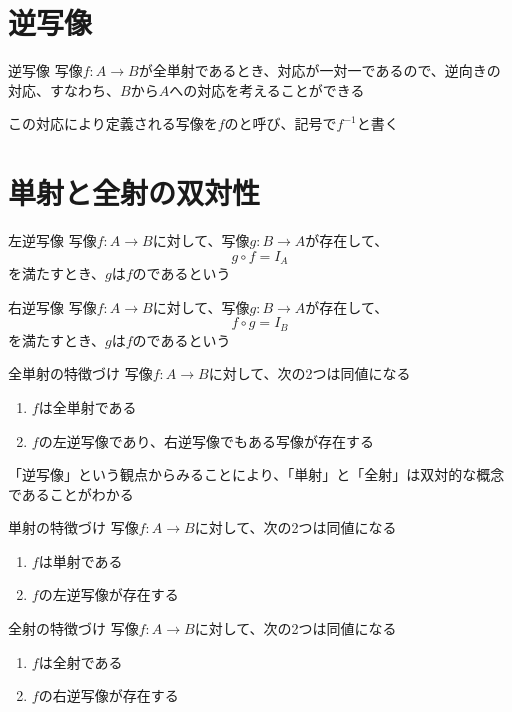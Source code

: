 \documentclass[../../../topic_mapping]{subfiles}
\begin{document}
\sectionline
\section{逆写像}

\begin{definition}{逆写像}
  写像$f\colon A \to B$が全単射であるとき、対応が一対一であるので、逆向きの対応、すなわち、$B$から$A$への対応を考えることができる

  この対応により定義される写像を$f$のと呼び、記号で$f^{-1}$と書く
\end{definition}

\sectionline
\section{単射と全射の双対性}

\begin{definition}{左逆写像}
  写像$f\colon A \to B$に対して、写像$g\colon B \to A$が存在して、
  \begin{equation*}
    g \circ f = I_A
  \end{equation*}
  を満たすとき、$g$は$f$のであるという
\end{definition}

\begin{definition}{右逆写像}
  写像$f\colon A \to B$に対して、写像$g\colon B \to A$が存在して、
  \begin{equation*}
    f \circ g = I_B
  \end{equation*}
  を満たすとき、$g$は$f$のであるという
\end{definition}

\begin{theorem}{全単射の特徴づけ}
  写像$f\colon A \to B$に対して、次の2つは同値になる
  \begin{enumerate}
    \item $f$は全単射である
    \item $f$の左逆写像であり、右逆写像でもある写像が存在する
  \end{enumerate}
\end{theorem}

\sectionline

「逆写像」という観点からみることにより、「単射」と「全射」は双対的な概念であることがわかる

\begin{theorem}{単射の特徴づけ}
  写像$f\colon A \to B$に対して、次の2つは同値になる
  \begin{enumerate}
    \item $f$は単射である
    \item $f$の左逆写像が存在する
  \end{enumerate}
\end{theorem}

\begin{theorem}{全射の特徴づけ}
  写像$f\colon A \to B$に対して、次の2つは同値になる
  \begin{enumerate}
    \item $f$は全射である
    \item $f$の右逆写像が存在する
  \end{enumerate}
\end{theorem}
\end{document}
